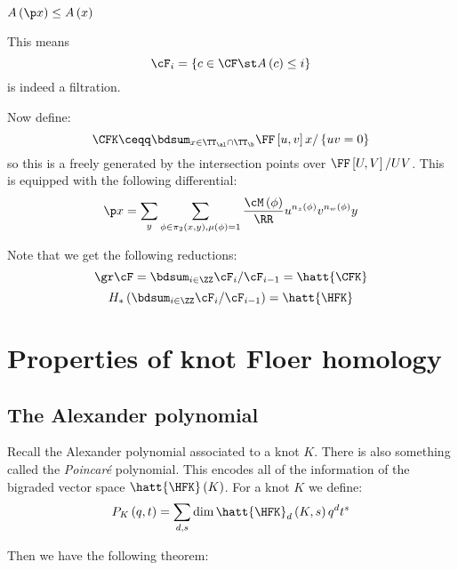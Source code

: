 \documentclass{amsproc}
\begin{document}
\begin{thm}
$A\left( \p x \right) \leq A\left( x \right)$
\end{thm}

This means
\begin{equation}
\cF_i = \left\{ c\in \CF \st A\left( c \right) \leq i \right\}
\end{equation}
is indeed a filtration.

Now define:
\begin{equation}
\CFK \ceqq
\bdsum_{x\in \TT_\al \cap \TT_\b}
\FF\left[ u,v \right] x / \left\{ uv = 0 \right\}
\end{equation}
so this is a freely generated by the intersection points over
$\FF\left[ U,V \right] / UV$. This is equipped with the following differential:
\begin{equation}
\p x = \sum_y
\sum_{\phi\in \pi_2\left( x,y \right), \mu\left( \phi\right) = 1}
\frac{\cM\left( \phi \right)}{\RR} u^{n_z\left( \phi \right)} v^{n_w\left( \phi \right)} y
\end{equation}

Note that we get the following reductions:
\begin{equation}
\gr \cF = \bdsum_{i\in \ZZ} \cF_i / \cF_{i-1}
= \hatt{\CFK}
\end{equation}
\begin{equation}
H_*\left( \bdsum_{i\in \ZZ} \cF_i / \cF_{i-1} \right) = 
\hatt{\HFK}
\end{equation}

\section{Properties of knot Floer homology}

\subsection{The Alexander polynomial}

Recall the Alexander polynomial associated to a knot $K$.
There is also something called the \emph{Poincar\'e} polynomial.
This encodes all of the information of the bigraded vector space 
$\hatt{\HFK}\left( K \right)$. For a knot $K$ we define:
\begin{equation}
P_K\left( q,t \right) = \sum_{d,s} 
\dim \hatt{\HFK}_d\left( K , s \right) q^d t^s
\end{equation}

Then we have the following theorem:
\end{document}
